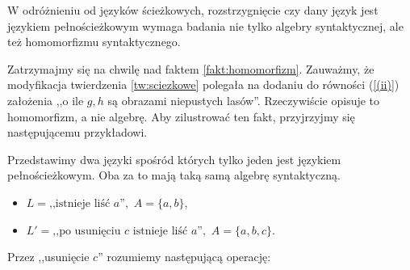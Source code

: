 \begin{fakt}\label{fakt:homomorfizm}
	W odróżnieniu od języków ścieżkowych, rozstrzygnięcie czy dany język jest językiem pełnościeżkowym wymaga badania nie tylko algebry syntaktycznej, ale też homomorfizmu syntaktycznego.
\end{fakt}

Zatrzymajmy się na chwilę nad faktem \ref{fakt:homomorfizm}. Zauważmy, że modyfikacja twierdzenia \ref{tw:sciezkowe} polegała na dodaniu do równości (\ref{(ii)}) założenia ,,o ile $g,h$ są obrazami niepustych lasów''. Rzeczywiście opisuje to homomorfizm, a nie algebrę. Aby zilustrować ten fakt, przyjrzyjmy się następującemu przykładowi.

\begin{przyklad}
	Przedstawimy dwa języki spośród których tylko jeden jest językiem pełnościeżkowym. Oba za to mają taką samą algebrę syntaktyczną.
	
	\begin{itemize}
		\item $L = \textrm{,,istnieje liść $a$''},$ $A = \{a,b\}$,
		\item $L' = \textrm{,,po usunięciu $c$ istnieje liść $a$''},$ $A = \{a,b,c\}$.
	\end{itemize}
	
	Przez ,,usunięcie $c$'' rozumiemy następującą operację:
	

\end{przyklad}
